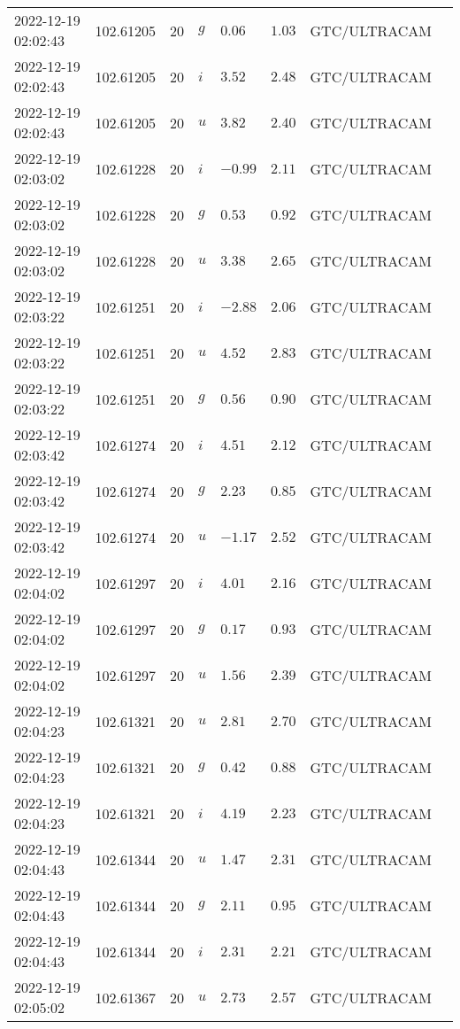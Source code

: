 \documentclass{nature_plusfigure}
\begin{document}
\begin{supplement}
\begin{center}
\begin{longtable}{llllllll}
2022-12-19 02:02:43 & 102.61205 & 20 & $g$ & $0.06$ & $1.03$ & GTC/ULTRACAM &  \\ 
2022-12-19 02:02:43 & 102.61205 & 20 & $i$ & $3.52$ & $2.48$ & GTC/ULTRACAM &  \\ 
2022-12-19 02:02:43 & 102.61205 & 20 & $u$ & $3.82$ & $2.40$ & GTC/ULTRACAM &  \\ 
2022-12-19 02:03:02 & 102.61228 & 20 & $i$ & $-0.99$ & $2.11$ & GTC/ULTRACAM &  \\ 
2022-12-19 02:03:02 & 102.61228 & 20 & $g$ & $0.53$ & $0.92$ & GTC/ULTRACAM &  \\ 
2022-12-19 02:03:02 & 102.61228 & 20 & $u$ & $3.38$ & $2.65$ & GTC/ULTRACAM &  \\ 
2022-12-19 02:03:22 & 102.61251 & 20 & $i$ & $-2.88$ & $2.06$ & GTC/ULTRACAM &  \\ 
2022-12-19 02:03:22 & 102.61251 & 20 & $u$ & $4.52$ & $2.83$ & GTC/ULTRACAM &  \\ 
2022-12-19 02:03:22 & 102.61251 & 20 & $g$ & $0.56$ & $0.90$ & GTC/ULTRACAM &  \\ 
2022-12-19 02:03:42 & 102.61274 & 20 & $i$ & $4.51$ & $2.12$ & GTC/ULTRACAM &  \\ 
2022-12-19 02:03:42 & 102.61274 & 20 & $g$ & $2.23$ & $0.85$ & GTC/ULTRACAM &  \\ 
2022-12-19 02:03:42 & 102.61274 & 20 & $u$ & $-1.17$ & $2.52$ & GTC/ULTRACAM &  \\ 
2022-12-19 02:04:02 & 102.61297 & 20 & $i$ & $4.01$ & $2.16$ & GTC/ULTRACAM &  \\ 
2022-12-19 02:04:02 & 102.61297 & 20 & $g$ & $0.17$ & $0.93$ & GTC/ULTRACAM &  \\ 
2022-12-19 02:04:02 & 102.61297 & 20 & $u$ & $1.56$ & $2.39$ & GTC/ULTRACAM &  \\ 
2022-12-19 02:04:23 & 102.61321 & 20 & $u$ & $2.81$ & $2.70$ & GTC/ULTRACAM &  \\ 
2022-12-19 02:04:23 & 102.61321 & 20 & $g$ & $0.42$ & $0.88$ & GTC/ULTRACAM &  \\ 
2022-12-19 02:04:23 & 102.61321 & 20 & $i$ & $4.19$ & $2.23$ & GTC/ULTRACAM &  \\ 
2022-12-19 02:04:43 & 102.61344 & 20 & $u$ & $1.47$ & $2.31$ & GTC/ULTRACAM &  \\ 
2022-12-19 02:04:43 & 102.61344 & 20 & $g$ & $2.11$ & $0.95$ & GTC/ULTRACAM &  \\ 
2022-12-19 02:04:43 & 102.61344 & 20 & $i$ & $2.31$ & $2.21$ & GTC/ULTRACAM &  \\ 
2022-12-19 02:05:02 & 102.61367 & 20 & $u$ & $2.73$ & $2.57$ & GTC/ULTRACAM &  \\ 

\end{longtable}
\end{center}
\end{supplement}
\end{document}
